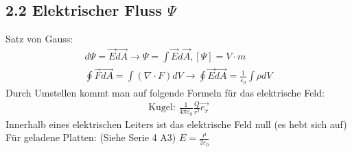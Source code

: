 \subsection*{2.2 Elektrischer Fluss $\Psi$}
    Satz von Gauss:
    \begin{align*}
        d\Psi = \overrightarrow{E} \overrightarrow{dA} \rightarrow \Psi = \int \overrightarrow{E} d \overrightarrow{A}, [\Psi] = V \cdot m \\
        \oint \overrightarrow{F} \overrightarrow{dA} = \int (\nabla \cdot F) dV \rightarrow \oint \overrightarrow{E} \overrightarrow{dA} = \frac{1}{\varepsilon_0} \int \rho dV
    \end{align*}
    Durch Umstellen kommt man auf folgende Formeln für das elektrische Feld:
    \begin{align*}
        \text{Kugel: } \frac{1}{4 \pi \varepsilon_0}\frac{Q}{r^2} \overrightarrow{e_r}
    \end{align*}
    Innerhalb eines elektrischen Leiters ist das elektrische Feld null (es hebt sich auf)\\
    Für geladene Platten: (Siehe Serie 4 A3) $E = \frac{\rho}{2 \varepsilon_0}$